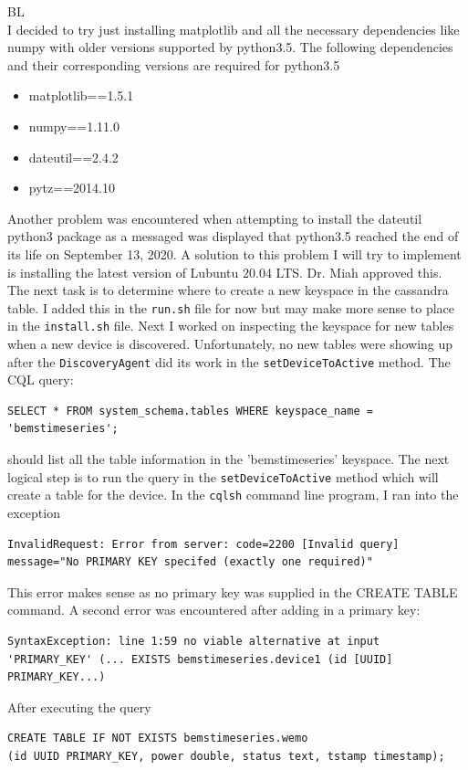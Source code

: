 \documentclass[fontsize=11pt, %
                             paper=letter, %
                             openany, %
                             captions=tableheading,
                             index=totoc,
                             hyperref]{labbook}
\begin{document}
BL\\
I decided to try just installing matplotlib and all the necessary dependencies like numpy with older versions supported by python3.5. The following dependencies and their corresponding versions are required for python3.5
\begin{itemize}
\item matplotlib==1.5.1
\item numpy==1.11.0
\item dateutil==2.4.2
\item pytz==2014.10
\end{itemize}
Another problem was encountered when attempting to install the dateutil python3 package as a messaged was displayed that python3.5 reached the end of its life on September 13, 2020. A solution to this problem I will try to implement is installing the latest version of Lubuntu 20.04 LTS. Dr. Miah approved this.
\medbreak\noindent
The next task is to determine where to create a new keyspace in the cassandra table. I added this in the \texttt{run.sh} file for now but may make more sense to place in the \texttt{install.sh} file. Next I worked on inspecting the keyspace for new tables when a new device is discovered. Unfortunately, no new tables were showing up after the \texttt{DiscoveryAgent} did its work in the \texttt{setDeviceToActive} method. The CQL query:
\begin{Verbatim}
SELECT * FROM system_schema.tables WHERE keyspace_name = 'bemstimeseries';
\end{Verbatim}
should list all the table information in the 'bemstimeseries' keyspace. The next logical step is to run the query in the \texttt{setDeviceToActive} method which will create a table for the device. In the \texttt{cqlsh} command line program, I ran into the exception
\begin{Verbatim}
InvalidRequest: Error from server: code=2200 [Invalid query] 
message="No PRIMARY KEY specifed (exactly one required)"
\end{Verbatim}
This error makes sense as no primary key was supplied in the CREATE TABLE command. A second error was encountered after adding in a primary key:
\begin{Verbatim}
SyntaxException: line 1:59 no viable alternative at input 
'PRIMARY_KEY' (... EXISTS bemstimeseries.device1 (id [UUID] PRIMARY_KEY...)
\end{Verbatim}
After executing the query 
\begin{Verbatim}
CREATE TABLE IF NOT EXISTS bemstimeseries.wemo 
(id UUID PRIMARY_KEY, power double, status text, tstamp timestamp);
\end{Verbatim}
\end{document}
